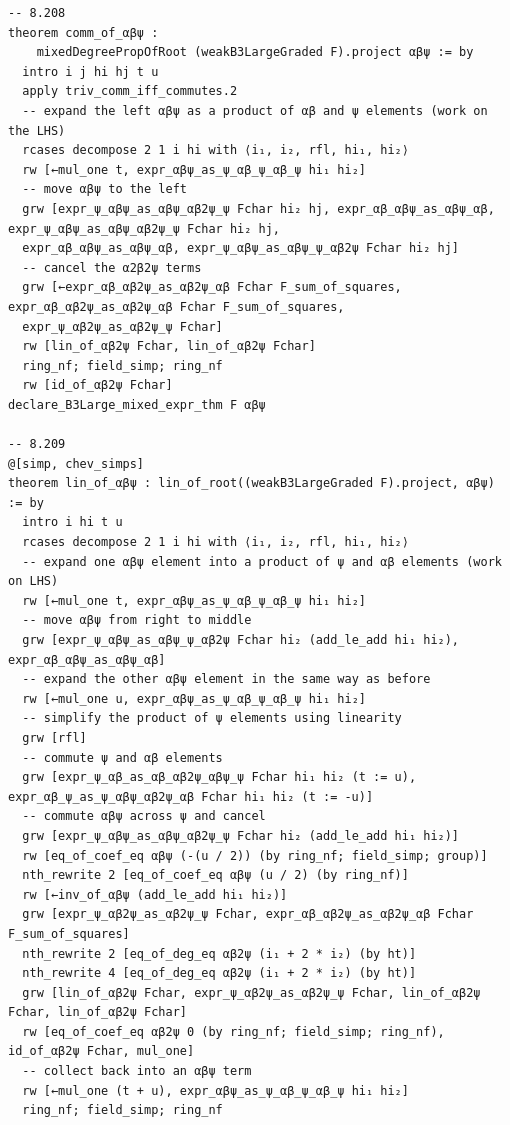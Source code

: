 \documentclass[10pt,a4paper]{article}
\begin{document}
\begin{Verbatim}
-- 8.208
theorem comm_of_αβψ :
    mixedDegreePropOfRoot (weakB3LargeGraded F).project αβψ := by
  intro i j hi hj t u
  apply triv_comm_iff_commutes.2
  -- expand the left αβψ as a product of αβ and ψ elements (work on the LHS)
  rcases decompose 2 1 i hi with ⟨i₁, i₂, rfl, hi₁, hi₂⟩
  rw [←mul_one t, expr_αβψ_as_ψ_αβ_ψ_αβ_ψ hi₁ hi₂]
  -- move αβψ to the left
  grw [expr_ψ_αβψ_as_αβψ_αβ2ψ_ψ Fchar hi₂ hj, expr_αβ_αβψ_as_αβψ_αβ, expr_ψ_αβψ_as_αβψ_αβ2ψ_ψ Fchar hi₂ hj,
  expr_αβ_αβψ_as_αβψ_αβ, expr_ψ_αβψ_as_αβψ_ψ_αβ2ψ Fchar hi₂ hj]
  -- cancel the α2β2ψ terms
  grw [←expr_αβ_αβ2ψ_as_αβ2ψ_αβ Fchar F_sum_of_squares, expr_αβ_αβ2ψ_as_αβ2ψ_αβ Fchar F_sum_of_squares,
  expr_ψ_αβ2ψ_as_αβ2ψ_ψ Fchar]
  rw [lin_of_αβ2ψ Fchar, lin_of_αβ2ψ Fchar]
  ring_nf; field_simp; ring_nf
  rw [id_of_αβ2ψ Fchar]
declare_B3Large_mixed_expr_thm F αβψ

-- 8.209
@[simp, chev_simps]
theorem lin_of_αβψ : lin_of_root((weakB3LargeGraded F).project, αβψ) := by
  intro i hi t u
  rcases decompose 2 1 i hi with ⟨i₁, i₂, rfl, hi₁, hi₂⟩
  -- expand one αβψ element into a product of ψ and αβ elements (work on LHS)
  rw [←mul_one t, expr_αβψ_as_ψ_αβ_ψ_αβ_ψ hi₁ hi₂]
  -- move αβψ from right to middle
  grw [expr_ψ_αβψ_as_αβψ_ψ_αβ2ψ Fchar hi₂ (add_le_add hi₁ hi₂), expr_αβ_αβψ_as_αβψ_αβ]
  -- expand the other αβψ element in the same way as before
  rw [←mul_one u, expr_αβψ_as_ψ_αβ_ψ_αβ_ψ hi₁ hi₂]
  -- simplify the product of ψ elements using linearity
  grw [rfl]
  -- commute ψ and αβ elements
  grw [expr_ψ_αβ_as_αβ_αβ2ψ_αβψ_ψ Fchar hi₁ hi₂ (t := u), expr_αβ_ψ_as_ψ_αβψ_αβ2ψ_αβ Fchar hi₁ hi₂ (t := -u)]
  -- commute αβψ across ψ and cancel
  grw [expr_ψ_αβψ_as_αβψ_αβ2ψ_ψ Fchar hi₂ (add_le_add hi₁ hi₂)]
  rw [eq_of_coef_eq αβψ (-(u / 2)) (by ring_nf; field_simp; group)]
  nth_rewrite 2 [eq_of_coef_eq αβψ (u / 2) (by ring_nf)]
  rw [←inv_of_αβψ (add_le_add hi₁ hi₂)]
  grw [expr_ψ_αβ2ψ_as_αβ2ψ_ψ Fchar, expr_αβ_αβ2ψ_as_αβ2ψ_αβ Fchar F_sum_of_squares]
  nth_rewrite 2 [eq_of_deg_eq αβ2ψ (i₁ + 2 * i₂) (by ht)]
  nth_rewrite 4 [eq_of_deg_eq αβ2ψ (i₁ + 2 * i₂) (by ht)]
  grw [lin_of_αβ2ψ Fchar, expr_ψ_αβ2ψ_as_αβ2ψ_ψ Fchar, lin_of_αβ2ψ Fchar, lin_of_αβ2ψ Fchar]
  rw [eq_of_coef_eq αβ2ψ 0 (by ring_nf; field_simp; ring_nf), id_of_αβ2ψ Fchar, mul_one]
  -- collect back into an αβψ term
  rw [←mul_one (t + u), expr_αβψ_as_ψ_αβ_ψ_αβ_ψ hi₁ hi₂]
  ring_nf; field_simp; ring_nf


\end{Verbatim}
\end{document}
